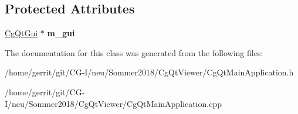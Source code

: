 \subsection*{Protected Attributes}
\begin{DoxyCompactItemize}
\item 
\mbox{\label{class_cg_qt_main_application_a0a779b5255600bf898096699638512d2}} 
\hyperlink{class_cg_qt_gui}{Cg\+Qt\+Gui} $\ast$ {\bfseries m\+\_\+gui}
\end{DoxyCompactItemize}


The documentation for this class was generated from the following files\+:\begin{DoxyCompactItemize}
\item 
/home/gerrit/git/\+C\+G-\/\+I/neu/\+Sommer2018/\+Cg\+Qt\+Viewer/Cg\+Qt\+Main\+Application.\+h\item 
/home/gerrit/git/\+C\+G-\/\+I/neu/\+Sommer2018/\+Cg\+Qt\+Viewer/Cg\+Qt\+Main\+Application.\+cpp\end{DoxyCompactItemize}
